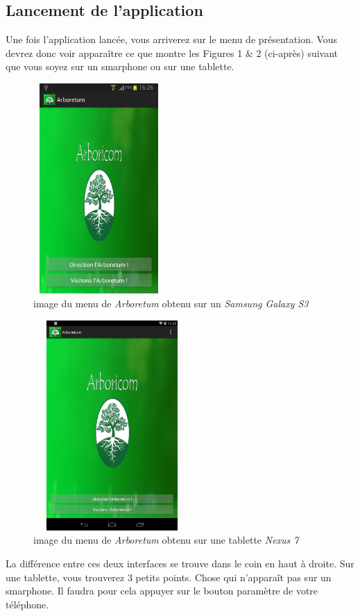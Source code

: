 \documentclass[a4paper,11pt]{article}
\begin{document}
    \subsection{Lancement de l'application}
    Une fois l'application lancée, vous arriverez sur le menu de présentation. Vous devrez donc voir apparaître ce que montre les Figures 1 \& 2 (ci-après)
    suivant que vous soyez sur un smarphone ou sur une tablette.
    \begin{figure}[H]
     \begin{center}
      \includegraphics[width=5cm,height=8cm]{menu.png}
      \caption{image du menu de \textit{Arboretum} obtenu sur un \textit{Samsung Galaxy S3}}
     \end{center}
    \end{figure}
    \begin{figure}[H]
     \begin{center}
      \includegraphics[width=6cm,height=8cm]{menuTablette.png}
      \caption{image du menu de \textit{Arboretum} obtenu sur une tablette \textit{Nexus 7}}
     \end{center}
    \end{figure}
    La différence entre ces deux interfaces se trouve dans le coin en haut à droite. Sur une tablette, vous trouverez 3 petits points. Chose qui
    n'apparaît pas sur un smarphone. Il faudra pour cela appuyer sur le bouton paramètre de votre téléphone.
    
\end{document}
